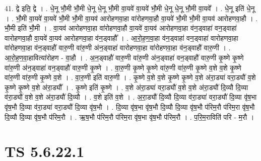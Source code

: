 \documentclass[17pt]{extarticle}
\begin{document}
41. द्वे इति॒ द्वे । . धे॒नू भौ॒मी भौ॒मी धे॒नू धे॒नू भौ॒मी वा॒यवे॑ वा॒यवे॑ भौ॒मी धे॒नू धे॒नू भौ॒मी वा॒यवे᳚ । . धे॒नू इति॑ धे॒नू । . भौ॒मी वा॒यवे॑ वा॒यवे॑ भौ॒मी भौ॒मी वा॒यव॑ आरोहणवा॒हा वा॑रोहणवा॒हौ वा॒यवे॑ भौ॒मी भौ॒मी वा॒यव॑ आरोहणवा॒हौ । . भौ॒मी इति॑ भौ॒मी । . वा॒यव॑ आरोहणवा॒हा वा॑रोहणवा॒हौ वा॒यवे॑ वा॒यव॑ आरोहणवा॒हा व॑न॒ड्वाहा॑ वन॒ड्वाहा॑ वारोहणवा॒हौ वा॒यवे॑ वा॒यव॑ आरोहणवा॒हा व॑न॒ड्वाहौ᳚ । . आ॒रो॒ह॒ण॒वा॒हा व॑न॒ड्वाहा॑ वन॒ड्वाहा॑ वारोहणवा॒हा वा॑रोहणवा॒हा व॑न॒ड्वाहौ॑ वारु॒णी वा॑रु॒णी अ॑न॒ड्वाहा॑ वारोहणवा॒हा वा॑रोहणवा॒हा व॑न॒ड्वाहौ॑ वारु॒णी । . आ॒रो॒ह॒ण॒वा॒हावित्या॑रोहण - वा॒हौ । . अ॒न॒ड्वाहौ॑ वारु॒णी वा॑रु॒णी अ॑न॒ड्वाहा॑ वन॒ड्वाहौ॑ वारु॒णी कृ॒ष्णे कृ॒ष्णे वा॑रु॒णी अ॑न॒ड्वाहा॑ वन॒ड्वाहौ॑ वारु॒णी कृ॒ष्णे । . वा॒रु॒णी कृ॒ष्णे कृ॒ष्णे वा॑रु॒णी वा॑रु॒णी कृ॒ष्णे व॒शे व॒शे कृ॒ष्णे वा॑रु॒णी वा॑रु॒णी कृ॒ष्णे व॒शे । . वा॒रु॒णी इति॑ वारु॒णी । . कृ॒ष्णे व॒शे व॒शे कृ॒ष्णे कृ॒ष्णे व॒शे अ॑रा॒ड्या॑ वरा॒ड्यौ॑ व॒शे कृ॒ष्णे कृ॒ष्णे व॒शे अ॑रा॒ड्यौ᳚ । . कृ॒ष्णे इति॑ कृ॒ष्णे । . व॒शे अ॑रा॒ड्या॑ वरा॒ड्यौ॑ व॒शे व॒शे अ॑रा॒ड्यौ॑ दि॒व्यौ दि॒व्या व॑रा॒ड्यौ॑ व॒शे व॒शे अ॑रा॒ड्यौ॑ दि॒व्यौ । . व॒शे इति॑ व॒शे । . अ॒रा॒ड्यौ॑ दि॒व्यौ दि॒व्या व॑रा॒ड्या॑ वरा॒ड्यौ॑ दि॒व्या वृ॑ष॒भा वृ॑ष॒भौ दि॒व्या व॑रा॒ड्या॑ वरा॒ड्यौ॑ दि॒व्या वृ॑ष॒भौ । . दि॒व्या वृ॑ष॒भा वृ॑ष॒भौ दि॒व्यौ दि॒व्या वृ॑ष॒भौ प॑रिम॒रौ प॑रिम॒रा वृ॑ष॒भौ दि॒व्यौ दि॒व्या वृ॑ष॒भौ प॑रिम॒रौ । . ऋ॒ष॒भौ प॑रिम॒रौ प॑रिम॒रा वृ॑ष॒भा वृ॑ष॒भौ प॑रिम॒रौ । . प॒रि॒म॒राविति॑ परि - म॒रौ । \newline
\pagebreak
{}

\section{ TS 5.6.22.1 }
\end{document}
